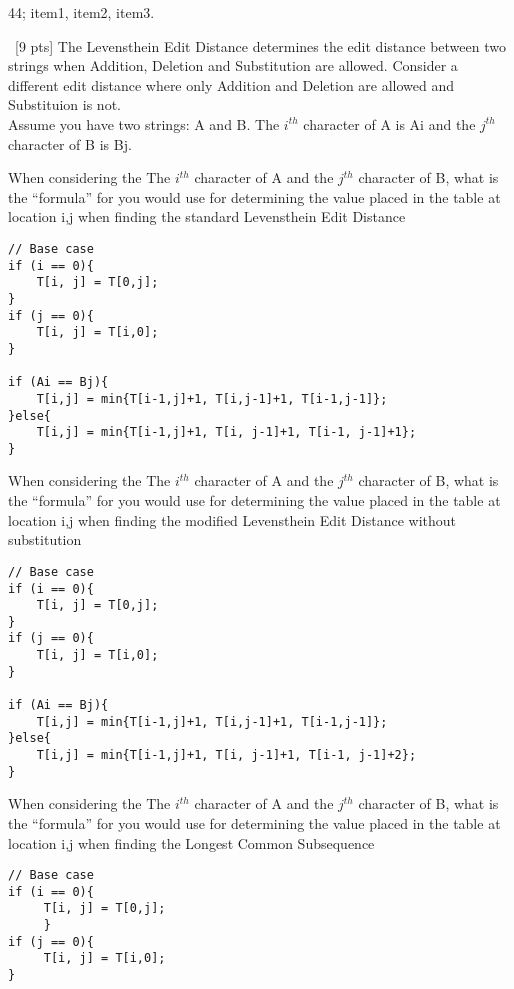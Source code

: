 \documentclass[12pt]{article}
\newenvironment{sol}[1][Solution]{\begin{trivlist}\item[\hskip\labelsep {\bfseries #1:}]}{\end{trivlist}}
\begin{document}
\begin{enumerate}
\begin{sol}
\begin{center}
    \end{center}
    44; item1, item2, item3. 
    \end{sol}
    \item \ [9 pts] The Levensthein Edit Distance determines the edit distance between two strings when Addition, Deletion and Substitution are allowed. Consider a different edit distance where only Addition and Deletion are allowed and Substituion is not.\\
    Assume you have two strings: A and B. The $i^{th}$ character of A is Ai and the $j^{th}$ character of B is Bj.
    \begin{enumerate}
        \item When considering the The $i^{th}$  character of A and the $j^{th}$ character of B, what is the “formula” for you would use for determining the value placed in the table at location i,j when finding the standard Levensthein Edit Distance
        \begin{sol}
        \hspace*{\fill}
             \begin{verbatim}
// Base case
if (i == 0){
    T[i, j] = T[0,j];
}
if (j == 0){
    T[i, j] = T[i,0];
}

if (Ai == Bj){
    T[i,j] = min{T[i-1,j]+1, T[i,j-1]+1, T[i-1,j-1]};
}else{
    T[i,j] = min{T[i-1,j]+1, T[i, j-1]+1, T[i-1, j-1]+1};
}
\end{verbatim}
        \end{sol}
        \item When considering the The  $i^{th}$ character of A and the $j^{th}$ character of B, what is the “formula” for you would use for determining the value placed in the table at location i,j when finding the modified Levensthein Edit Distance without substitution
                \begin{sol}
        \hspace*{\fill}
             \begin{verbatim}
// Base case
if (i == 0){
    T[i, j] = T[0,j];
}
if (j == 0){
    T[i, j] = T[i,0];
}

if (Ai == Bj){
    T[i,j] = min{T[i-1,j]+1, T[i,j-1]+1, T[i-1,j-1]};
}else{
    T[i,j] = min{T[i-1,j]+1, T[i, j-1]+1, T[i-1, j-1]+2};
}
\end{verbatim}
        \end{sol}
        \item When considering the The $i^{th}$ character of A and the $j^{th}$ character of B, what is the “formula” for you would use for determining the value placed in the table at location i,j when finding the Longest Common Subsequence
                \begin{sol}
        \hspace*{\fill}
             \begin{verbatim}
// Base case
if (i == 0){
     T[i, j] = T[0,j];
     }
if (j == 0){
     T[i, j] = T[i,0];
}


\end{verbatim}
\end{sol}
\end{enumerate}
\end{enumerate}
\end{document}
